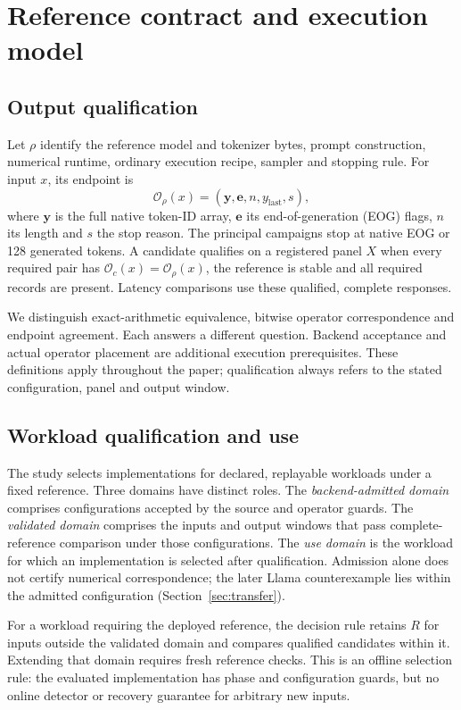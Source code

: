 \section{Reference contract and execution model}
\label{sec:contract}
\subsection{Output qualification}
Let $\rho$ identify the reference model and tokenizer bytes, prompt construction, numerical runtime, ordinary execution recipe, sampler and stopping rule. For input $x$, its endpoint is
\begin{equation}
\mathcal O_\rho(x)=(\mathbf y,\mathbf e,n,y_{\mathrm{last}},s),
\label{eq:endpoint}
\end{equation}
where $\mathbf y$ is the full native token-ID array, $\mathbf e$ its end-of-generation (EOG) flags, $n$ its length and $s$ the stop reason. The principal campaigns stop at native EOG or 128 generated tokens. A candidate qualifies on a registered panel $X$ when every required pair has $\mathcal O_c(x)=\mathcal O_\rho(x)$, the reference is stable and all required records are present. Latency comparisons use these qualified, complete responses.

We distinguish exact-arithmetic equivalence, bitwise operator correspondence and endpoint agreement. Each answers a different question. Backend acceptance and actual operator placement are additional execution prerequisites. These definitions apply throughout the paper; qualification always refers to the stated configuration, panel and output window.

\subsection{Workload qualification and use}
The study selects implementations for declared, replayable workloads under a fixed reference. Three domains have distinct roles. The \emph{backend-admitted domain} comprises configurations accepted by the source and operator guards. The \emph{validated domain} comprises the inputs and output windows that pass complete-reference comparison under those configurations. The \emph{use domain} is the workload for which an implementation is selected after qualification. Admission alone does not certify numerical correspondence; the later Llama counterexample lies within the admitted configuration (Section~\ref{sec:transfer}).

For a workload requiring the deployed reference, the decision rule retains $R$ for inputs outside the validated domain and compares qualified candidates within it. Extending that domain requires fresh reference checks. This is an offline selection rule: the evaluated implementation has phase and configuration guards, but no online detector or recovery guarantee for arbitrary new inputs.

